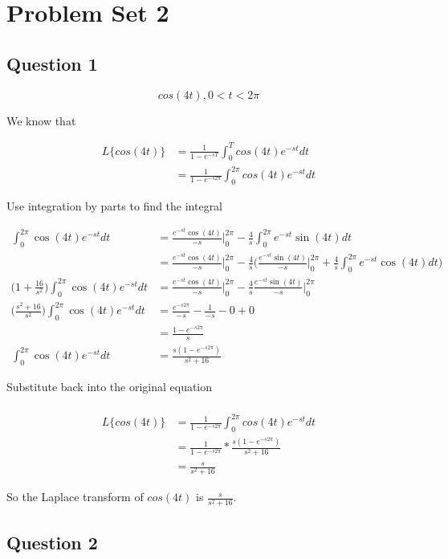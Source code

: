\documentclass[titlepage]{article}
\begin{document}
\section{Problem Set 2}
\subsection{Question 1}
$$cos(4t), 0 < t < 2\pi$$

\noindent We know that

\begin{align*}
  L\{cos(4t)\} &= \frac{1}{1 - e^{-sT}} \int_0^T cos(4t)e^{-st} dt
  \\&= \frac{1}{1 - e^{-s2\pi}} \int_0^{2\pi} cos(4t)e^{-st} dt
\end{align*}

\noindent Use integration by parts to find the integral

\begin{align*}
  \int_0^{2\pi} \cos(4t)e^{-st} dt &= \frac{e^{-st}\cos(4t)}{-s}\Big|_0^{2\pi} - \frac{4}{s} \int_0^{2\pi} e^{-st}\sin(4t) dt
  \\&= \frac{e^{-st}\cos(4t)}{-s}\Big|_0^{2\pi} - \frac{4}{s} \bigg(\frac{e^{-st}\sin(4t)}{-s}\Big|_0^{2\pi} + \frac{4}{s}\int_0^{2\pi}e^{-st}\cos(4t) dt\bigg)
  \\\bigg(1 + \frac{16}{s^2}\bigg)\int_0^{2\pi} \cos(4t)e^{-st} dt &= \frac{e^{-st}\cos(4t)}{-s}\Big|_0^{2\pi} - \frac{4}{s}\frac{e^{-st}\sin(4t)}{-s}\Big|_0^{2\pi}
  \\\bigg(\frac{s^2 + 16}{s^2}\bigg)\int_0^{2\pi} \cos(4t)e^{-st} dt &= \frac{e^{-s2\pi}}{-s} - \frac{1}{-s} - 0 + 0
  \\&= \frac{1 - e^{-s2\pi}}{s}
  \\\int_0^{2\pi} \cos(4t)e^{-st} dt &= \frac{s(1 - e^{-s2\pi})}{s^2 + 16}
\end{align*}

\noindent Substitute back into the original equation

\begin{align*}
  \\L\{cos(4t)\} &= \frac{1}{1 - e^{-s2\pi}} \int_0^{2\pi} cos(4t)e^{-st} dt
  \\&= \frac{1}{1 - e^{-s2\pi}} * \frac{s(1 - e^{-s2\pi})}{s^2 + 16}
  \\&= \frac{s}{s^2 + 16}
\end{align*}

\noindent So the Laplace transform of $cos(4t)$ is $\frac{s}{s^2 + 16}$.

\subsection{Question 2}
\end{document}

